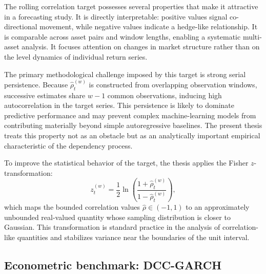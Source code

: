 The rolling correlation target possesses several properties that make it attractive in a forecasting study. It is directly interpretable: positive values signal co-directional movement, while negative values indicate a hedge-like relationship. It is comparable across asset pairs and window lengths, enabling a systematic multi-asset analysis. It focuses attention on changes in market structure rather than on the level dynamics of individual return series.

The primary methodological challenge imposed by this target is strong serial persistence. Because $\hat{\rho}_{t}^{(w)}$ is constructed from overlapping observation windows, successive estimates share $w-1$ common observations, inducing high autocorrelation in the target series. This persistence is likely to dominate predictive performance and may prevent complex machine-learning models from contributing materially beyond simple autoregressive baselines. The present thesis treats this property not as an obstacle but as an analytically important empirical characteristic of the dependency process.

To improve the statistical behavior of the target, the thesis applies the Fisher $z$-transformation:
\begin{equation}
    z_{t}^{(w)} = \frac{1}{2}\ln\!\left(\frac{1 + \hat{\rho}_{t}^{(w)}}{1 - \hat{\rho}_{t}^{(w)}}\right),
\end{equation}
which maps the bounded correlation values $\hat{\rho} \in (-1,1)$ to an approximately unbounded real-valued quantity whose sampling distribution is closer to Gaussian. This transformation is standard practice in the analysis of correlation-like quantities and stabilizes variance near the boundaries of the unit interval.

\subsection{Econometric benchmark: DCC-GARCH}

